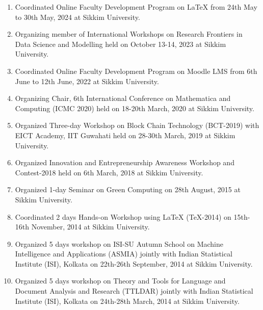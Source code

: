 \documentclass[11pt,a4paper]{moderncv}
\begin{document}
\begin{adjustwidth}{6em}{0pt}
	\begin{enumerate}
		
	
		\item Coordinated Online Faculty Development Program on LaTeX from 24th May to 30th May, 2024 at Sikkim University.
		
		\item Organizing member of International Workshops on Research Frontiers in Data Science and Modelling held on October 13-14, 2023 at Sikkim University.
		
		\item Coordinated Online Faculty Development Program on Moodle LMS from 6th June to 12th June, 2022 at Sikkim University.
		
		\item Organizing Chair, 6th International Conference on Mathematica and Computing (ICMC 2020) held on 18-20th March, 2020 at Sikkim University.
		
		\item Organized Three-day Workshop on Block Chain Technology (BCT-2019) with EICT Academy, IIT Guwahati held on 28-30th March, 2019 at Sikkim University.
		
		\item Organized Innovation and Entrepreneurship Awareness Workshop and Contest-2018 held on 6th March, 2018 at Sikkim University.
		
		\item Organized 1-day Seminar on Green Computing on 28th August, 2015 at Sikkim University.
		
		\item Coordinated 2 days Hands-on Workshop using LaTeX (TeX-2014) on 15th-16th November, 2014 at Sikkim University.
		
		\item Organized 5 days workshop on ISI-SU Autumn School on Machine Intelligence and Applications (ASMIA) jointly with Indian Statistical Institute (ISI), Kolkata on 22th-26th September, 2014 at Sikkim University.
		
		\item Organized 5 days workshop on Theory and Tools for Language and Document Analysis and Research (TTLDAR) jointly with Indian Statistical Institute (ISI), Kolkata on 24th-28th March, 2014 at Sikkim University.
		
	\end{enumerate}
\end{adjustwidth}
\end{document}
